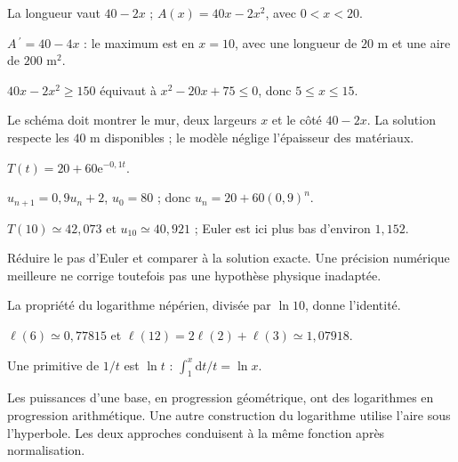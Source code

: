 \par\addvspace{6mm}\label{projet-cor-1}
\begin{questions}
\item La longueur vaut $40-2x$ ; $A(x)=40x-2x^2$, avec $0<x<20$.
\item $A\,\!^{\prime}=40-4x$ : le maximum est en $x=10$, avec une longueur de $20$ m et une aire de $200$ m$^2$.
\item $40x-2x^2\geq150$ équivaut à $x^2-20x+75\leq0$, donc $5\leq x\leq15$.
\item Le schéma doit montrer le mur, deux largeurs $x$ et le côté $40-2x$. La solution respecte les $40$ m disponibles ; le modèle néglige l’épaisseur des matériaux.
\end{questions}
\par\addvspace{6mm}\label{projet-cor-2}
\begin{questions}
\item $T(t)=20+60\mathrm e^{-0{,}1t}$.
\item $u_{n+1}=0{,}9u_n+2$, $u_0=80$ ; donc $u_n=20+60(0{,}9)^n$.
\item $T(10)\simeq42{,}073$ et $u_{10}\simeq40{,}921$ ; Euler est ici plus bas d’environ $1{,}152$.
\item Réduire le pas d’Euler et comparer à la solution exacte. Une précision numérique meilleure ne corrige toutefois pas une hypothèse physique inadaptée.
\end{questions}
\par\addvspace{6mm}\label{projet-cor-3}
\begin{questions}
\item La propriété du logarithme népérien, divisée par $\ln10$, donne l’identité.
\item $\ell(6)\simeq0{,}77815$ et $\ell(12)=2\ell(2)+\ell(3)\simeq1{,}07918$.
\item Une primitive de $1/t$ est $\ln t$ : $\int_1^x\mathrm dt/t=\ln x$.
\item Les puissances d’une base, en progression géométrique, ont des logarithmes en progression arithmétique. Une autre construction du logarithme utilise l’aire sous l’hyperbole. Les deux approches conduisent à la même fonction après normalisation.
\end{questions}
